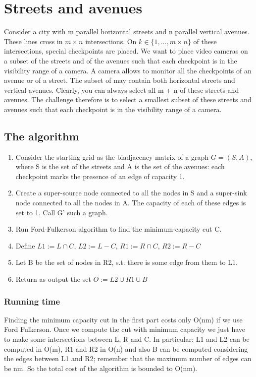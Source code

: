 \section{Streets and avenues}
Consider a city with m parallel horizontal streets and n parallel vertical avenues.
These lines cross in $m \times n$ intersections. On $k \in \{1, ... ,m \times n\}$ of these intersections, special checkpoints are placed. We want to place video cameras on a subset of the streets and of the avenues such that each checkpoint is in the visibility range of a camera. A camera allows to monitor all the checkpoints of an avenue or of a street. The subset of may contain both
horizontal streets and vertical avenues. Clearly, you can always select all m + n of these streets and avenues. The challenge therefore is to select a smallest subset of these streets and avenues such that each checkpoint is in the visibility range of a camera.

\subsection{The algorithm}
\begin{enumerate}
	\item Consider the starting grid as the biadjacency matrix of a graph $G = (S, A)$, where S is the set of the streets and A is the set of the avenues: each checkpoint marks the presence of an edge of capacity 1.
	\item Create a super-source node connected to all the nodes in S and a super-sink node connected to all the nodes in A. The capacity of each of these edges is set to 1. Call G' such a graph.
	\item Run Ford-Fulkerson algorithm to find the minimum-capacity cut C.
	\item Define $L1 := L \cap C$, $L2 := L - C$, $R1 := R \cap C$, $R2 := R - C$
	\item Let B be the set of nodes in R2, s.t. there is some edge from them to L1.
	\item Return as output the set $O:= L2 \cup R1 \cup B$
\end{enumerate}

\subsubsection{Running time}
Finding the minimum capacity cut in the first part costs only O(nm) if we use Ford Fulkerson. Once we compute the cut with minimum capacity we just have to make some intersections between L, R and C. In particular: L1 and L2 can be computed in O(m), R1 and R2 in O(n) and also B can be computed considering the edges between L1 and R2; remember that the maximum number of edges can be nm. So the total cost of the algorithm is bounded to O(nm).

